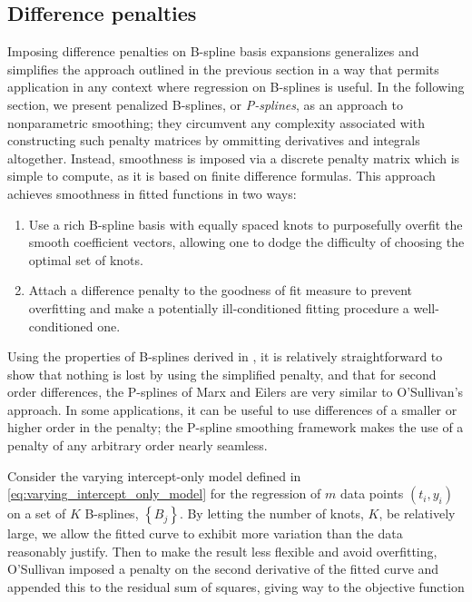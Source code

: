 \documentclass[12pt]{article}
\newcommand*\needsparaphrased{\color{red}}
\theoremstyle{definition}
\begin{document}
 
 \subsection{Difference penalties}
 
Imposing difference penalties on B-spline basis expansions generalizes and simplifies the approach outlined in the previous section in a way that permits application in any context where regression on B-splines is useful. In the following section, we present penalized B-splines, or \emph{P-splines}, as an approach to nonparametric smoothing; they circumvent any complexity associated with constructing such penalty matrices by ommitting derivatives and integrals altogether. Instead, smoothness is imposed via a discrete penalty matrix which is simple to compute, as it is based on finite difference formulas. This approach achieves smoothness in fitted functions in two ways:

\begin{enumerate}
\item Use a rich B-spline basis with equally spaced knots to purposefully overfit the smooth coefficient vectors, allowing one to dodge the difficulty of choosing the optimal set of knots.
\item Attach a difference penalty to the goodness of fit measure to prevent overfitting and make a potentially ill-conditioned fitting procedure a well-conditioned one.
\end{enumerate}  
 
Using the properties of B-splines derived in {\needsparaphrased{B-spline section}}, it is relatively straightforward to show that nothing is lost by using the simplified penalty, and that for second order differences, the P-splines of Marx and Eilers are very similar to O'Sullivan's approach. In some applications, it can be useful to use differences of a smaller or higher order in the penalty; the P-spline smoothing framework makes the use of a penalty of any arbitrary order nearly seamless. 
 
Consider the varying intercept-only model defined in \ref{eq:varying_intercept_only_model} for the regression of $m$ data points $\left(t_i,y_i\right)$ on a set of $K$ B-splines, $\left\{B_j\right\}$.  By letting the number of knots, $K$, be relatively large, we allow the fitted curve to exhibit more variation than the data reasonably justify. Then to make the result less flexible and avoid overfitting, O'Sullivan imposed a penalty on the second derivative of the fitted curve and appended this to the residual sum of squares, giving way to the objective function
\end{document}
